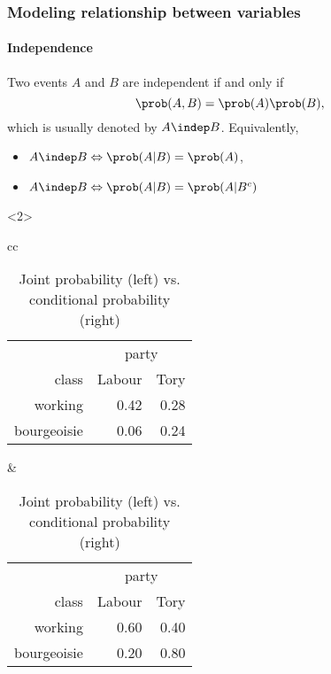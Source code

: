 \begin{frame}
  \frametitle{Modeling relationship between variables}
  \framesubtitle{Independence}

  \begin{definition}
    Two events $A$ and $B$ are independent if and only if
    \begin{equation*}
      \prob(A,B) = \prob(A) \prob(B),
    \end{equation*}
    which is usually denoted by $A \indep B$. Equivalently,
    \begin{itemize}
    \item $A \indep B \Leftrightarrow \prob(A | B) = \prob(A)$,
    \item $A \indep B \Leftrightarrow \prob(A | B) = \prob(A | B^c) $
    \end{itemize}
  \end{definition}

  \begin{example}<2>
    \vspace{-.5cm}
    \begin{table}
      \centering
      \begin{small}
      \begin{tabular}{cc}
        \begin{tabular}{rrr}
        & \multicolumn{2}{c}{party} \\
        class & Labour & Tory \\ \hline
        working & 0.42 & 0.28 \\
        bourgeoisie & 0.06 & 0.24 \\
      \end{tabular} 
      & 
      \begin{tabular}{rrr}
        & \multicolumn{2}{c}{party} \\
        class & Labour & Tory \\ \hline
        working & 0.60 & 0.40 \\
        bourgeoisie & 0.20 & 0.80 \\
      \end{tabular} 
      \end{tabular} 
      \caption{Joint probability (left) vs. conditional probability (right)} 
      \end{small}
    \end{table}
  \end{example}
\end{frame}

